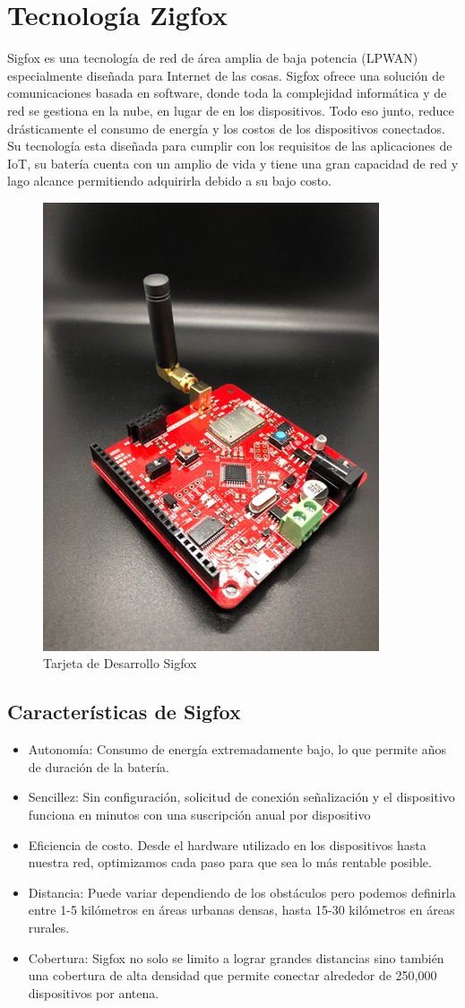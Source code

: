 \documentclass[12pt]{book}
\begin{document}
\section{Tecnología Zigfox}
Sigfox es una tecnología de red de área amplia de baja potencia (LPWAN) especialmente diseñada para Internet de las cosas. Sigfox ofrece una solución de comunicaciones basada en software, donde toda la complejidad informática y de red se gestiona en la nube, en lugar de en los dispositivos. Todo eso junto, reduce drásticamente el consumo de energía y los costos de los dispositivos conectados. Su tecnología esta diseñada para cumplir con los requisitos de las aplicaciones de IoT, su batería cuenta con un amplio de vida y tiene una gran capacidad de red y lago alcance permitiendo adquirirla debido a su bajo costo.
\begin{figure}[h]
	\centering
	\includegraphics[width=0.4\linewidth]{imagenes/file}
	\caption[Tarjeta de Desarrollo Sigfox]{Tarjeta de Desarrollo Sigfox}
	\label{fig:file}
\end{figure}
\vspace{10cm}

\subsection{Características de Sigfox}
\begin{itemize}
	\item Autonomía: Consumo de energía extremadamente bajo, lo que permite años de duración de la batería.
	\item Sencillez: Sin configuración, solicitud de conexión señalización y el dispositivo funciona en minutos con una suscripción anual por dispositivo
	\item Eficiencia de costo. Desde el hardware utilizado en los dispositivos hasta nuestra red, optimizamos cada paso para que sea lo más rentable posible.
	\item Distancia: Puede variar dependiendo de los obstáculos pero podemos definirla entre 1-5 kilómetros en áreas urbanas densas, hasta 15-30 kilómetros en áreas rurales.
	\item Cobertura: Sigfox no solo se limito a lograr grandes distancias sino también una cobertura de alta densidad que permite conectar alrededor de 250,000 dispositivos por antena.
\end{itemize}
\end{document}
